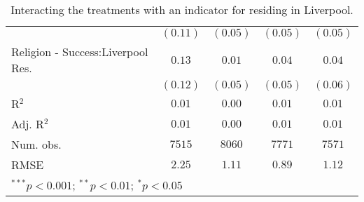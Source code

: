 \begin{table}[H]
\begin{center}
\begin{footnotesize}
\begin{tabular}{l c c c c}
                                   & $(0.11)$   & $(0.05)$     & $(0.05)$     & $(0.05)$     \\
Religion - Success:Liverpool Res.  & $0.13$     & $0.01$       & $0.04$       & $0.04$       \\
                                   & $(0.12)$   & $(0.05)$     & $(0.05)$     & $(0.06)$     \\
\hline
R$^2$                              & $0.01$     & $0.00$       & $0.01$       & $0.01$       \\
Adj. R$^2$                         & $0.01$     & $0.00$       & $0.01$       & $0.01$       \\
Num. obs.                          & $7515$     & $8060$       & $7771$       & $7571$       \\
RMSE                               & $2.25$     & $1.11$       & $0.89$       & $1.12$       \\
\hline
\multicolumn{5}{l}{\tiny{$^{***}p<0.001$; $^{**}p<0.01$; $^{*}p<0.05$}}
\end{tabular}
\end{footnotesize}
\caption{Interacting the treatments with an indicator for residing in Liverpool.}
\label{tab:ate_residence}
\end{center}
\end{table}
